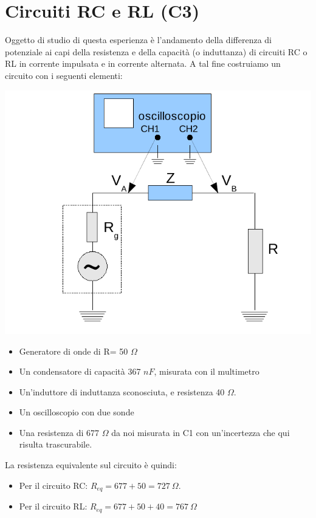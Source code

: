 ﻿\chapter{Circuiti RC e RL (C3)}

Oggetto di studio di questa esperienza è l'andamento della differenza di potenziale ai capi della resistenza e della capacità (o induttanza) di circuiti RC o RL in corrente impulsata e in corrente alternata.
A tal fine costruiamo un circuito con i seguenti elementi:

\begin{center}
 \includegraphics[scale=0.70]{grafici/C3/schema.png}
\end{center}

\begin{itemize}
  \item Generatore di onde di R= 50 $\Omega$
  \item Un condensatore di capacità 367 $nF$, misurata con il multimetro
  \item Un'induttore di induttanza sconosciuta, e resistenza 40 $\Omega$.
  \item Un oscilloscopio con due sonde
  \item Una resistenza di 677 $\Omega$ da noi misurata in C1 con un'incertezza che qui risulta trascurabile. 
\end{itemize}
La resistenza equivalente sul circuito è quindi:
\begin{itemize}
 \item Per il circuito RC: $R_{eq} = 677+50 = 727\ \Omega$.
 \item Per il circuito RL: $R_{eq} = 677+50+40 = 767\ \Omega$
\end{itemize}

